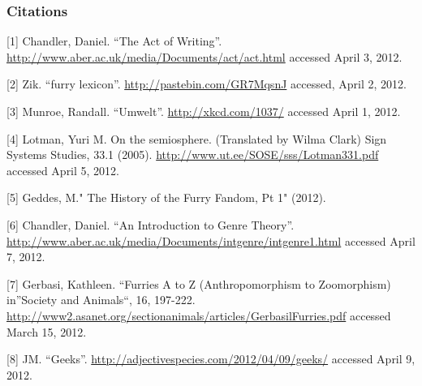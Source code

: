 \subsubsection{Citations}\label{citations}

{[}1{]} Chandler, Daniel. ``The Act of Writing''.
\url{http://www.aber.ac.uk/media/Documents/act/act.html} accessed April
3, 2012.

{[}2{]} Zik. ``furry lexicon''. \url{http://pastebin.com/GR7MqsnJ}
accessed, April 2, 2012.

{[}3{]} Munroe, Randall. ``Umwelt''. \url{http://xkcd.com/1037/}
accessed April 1, 2012.

{[}4{]} Lotman, Yuri M. On the semiosphere. (Translated by Wilma Clark)
Sign Systems Studies, 33.1 (2005).
\url{http://www.ut.ee/SOSE/sss/Lotman331.pdf} accessed April 5, 2012.

{[}5{]} Geddes, M." The History of the Furry Fandom, Pt 1" (2012).

{[}6{]} Chandler, Daniel. ``An Introduction to Genre Theory''.
\url{http://www.aber.ac.uk/media/Documents/intgenre/intgenre1.html}
accessed April 7, 2012.

{[}7{]} Gerbasi, Kathleen. ``Furries A to Z (Anthropomorphism to
Zoomorphism) in''Society and Animals``, 16, 197-222.
\url{http://www2.asanet.org/sectionanimals/articles/GerbasilFurries.pdf}
accessed March 15, 2012.

{[}8{]} JM. ``Geeks''.
\url{http://adjectivespecies.com/2012/04/09/geeks/} accessed April 9,
2012.
